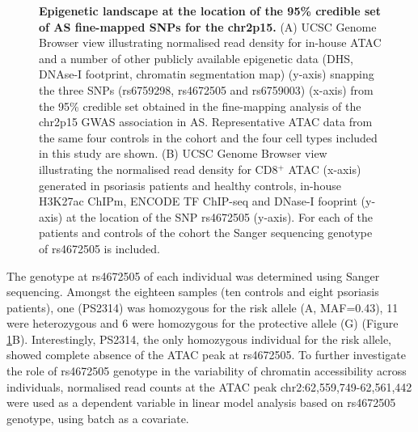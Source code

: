 \begin{figure}[htbp]
\caption[Epigenetic landscape at the location of the 95\% credible set of AS fine-mapped SNPs for the chr2p15.]{\textbf{Epigenetic landscape at the location of the 95\% credible set of AS fine-mapped SNPs for the chr2p15.} (A) UCSC Genome Browser view illustrating normalised read density for in-house ATAC and a number of other publicly available epigenetic data (DHS, DNAse-I footprint, chromatin segmentation map) (y-axis) snapping the three SNPs (rs6759298, rs4672505 and rs6759003) (x-axis) from the 95\% credible set obtained in the fine-mapping analysis of the chr2p15 GWAS association in AS. Representative ATAC data from the same four controls in the cohort and the four cell types included in this study are shown. (B) UCSC Genome Browser view illustrating the normalised read density for CD8$^+$ ATAC (x-axis) generated in psoriasis patients and healthy controls, in-house H3K27ac ChIPm, ENCODE TF ChIP-seq and DNase-I fooprint (y-axis) at the location of the SNP rs4672505 (y-axis). For each of the patients and controls of the cohort the Sanger sequencing genotype of rs4672505 is included.}
\label{figure:ATAC_PS_CTL_chr2p15_rs4672505}
\end{figure} 





The genotype at rs4672505 of each individual was determined using Sanger sequencing. Amongst the eighteen samples (ten controls and eight psoriasis patients), one (PS2314) was homozygous for the risk allele (A, MAF=0.43), 11 were heterozygous and 6 were homozygous for the protective allele (G) (Figure \ref{figure:ATAC_PS_CTL_chr2p15_rs4672505}B). Interestingly, PS2314, the only homozygous individual for the risk allele, showed complete absence of the ATAC peak at rs4672505. To further investigate the role of rs4672505 genotype in the variability of chromatin accessibility across individuals, normalised read counts at the ATAC peak chr2:62,559,749-62,561,442 were used as a dependent variable in linear model analysis based on rs4672505 genotype, using batch as a covariate. 



